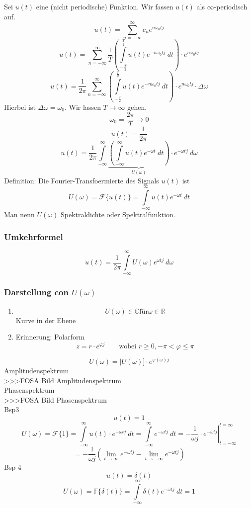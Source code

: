 Sei $u(t)$ eine (nicht periodische) Funktion. Wir fassen $u(t)$ als 
$\infty$-periodisch auf. 
\[ u(t) = \sum\limits_{n = -\infty}^{\infty} c_n e^{n \omega_0 t j} \]
\[ u(t) = \sum\limits_{n = -\infty}^{\infty} \frac{1}{T} 
\left(\int\limits_{-\frac{T}{2}}^{\frac{T}{2}} u(t) e^{-n \omega_0 t j} ~ dt 
\right)\cdot  e^{n \omega_0 t j} \]
\[ u(t) = \frac{1}{2 \pi} \sum\limits_{n = -\infty}^{\infty}
\left(\int\limits_{-\frac{T}{2}}^{\frac{T}{2}} u(t) e^{-n \omega_0 t j} ~ dt 
\right)\cdot  e^{n \omega_0 t j} \cdot \Delta \omega \]
Hierbei ist $\Delta \omega = \omega_0$. Wir lassen $T \to \infty$ gehen. 
\[ \omega_0 = \frac{2 \pi}{T} \to 0 \]
\[ u(t) = \frac{1}{2 \pi} \]
\[ u(t) = \frac{1}{2 \pi} \int\limits_{-\infty}^{\infty}
\underbrace{\left(\int\limits_{-\infty}^{\infty} u(t) e^{-\omega t} ~ dt 
\right)}_{U(\omega)}\cdot  e^{-\omega t j} ~ d\omega \]
Definition: Die Fourier-Transfoermierte des Signals $u(t)$ ist 
\[ U(\omega) = \mathcal{F}\{ u(t) \} = \int\limits_{-\infty}^{\infty} 
u(t) e^{-\omega t} ~dt \]
Man nenn $U(\omega)$ Spektraldichte oder Spektralfunktion. 

\subsubsection{Umkehrformel}
\[ u(t) = \frac{1}{2 \pi} \int\limits_{-\infty}^{\infty} 
U(\omega) e^{\omega t j} ~ d\omega \]

\subsubsection{Darstellung con $U(\omega)$}
\begin{enumerate}
\item \[ U(\omega) \in \mathbb{C} \text{für} \omega \in \mathbb{R} \]
Kurve in der Ebene
\item Erinnerung: Polarform
\[ z = r \cdot e^{\varphi j} 
\qquad \text{wobei }r \geq 0, -\pi < \varphi \leq \pi \]
\end{enumerate}
\[ U(\omega) = |U(\omega)] \cdot e^{\varphi(\omega) j} \]
Amplitudenspektrum\\
>>>FOSA Bild Amplitudenspektrum\\
Phasenspektrum\\
>>>FOSA Bild Phasenspektrum\\
Bsp3
\[ u(t) = 1 \]
\[ U(\omega) = \mathcal{F}\{1\} 
= \int\limits_{-\infty}^{\infty} u(t) \cdot e^{-\omega t j} ~ dt 
= \int\limits_{-\infty}^{\infty} e^{-\omega t j} ~ dt 
= \left.-\frac{1}{\omega j} \cdot e^{-\omega t j}\right|
_{t = -\infty}^{t = \infty} \]
\[ = -\frac{1}{\omega j} \left(\lim\limits_{t \to \infty} e^{-\omega t j} 
- \lim\limits_{t \to -\infty} e^{-\omega t j}\right) \]
Bsp 4
\[ u(t) = \delta(t) \]
\[ U(\omega) = \mathbb{F}\{\delta (t)\} = \int\limits_{-\infty}^{\infty} 
\delta (t) e^{-\omega t j} ~dt = 1 \]

